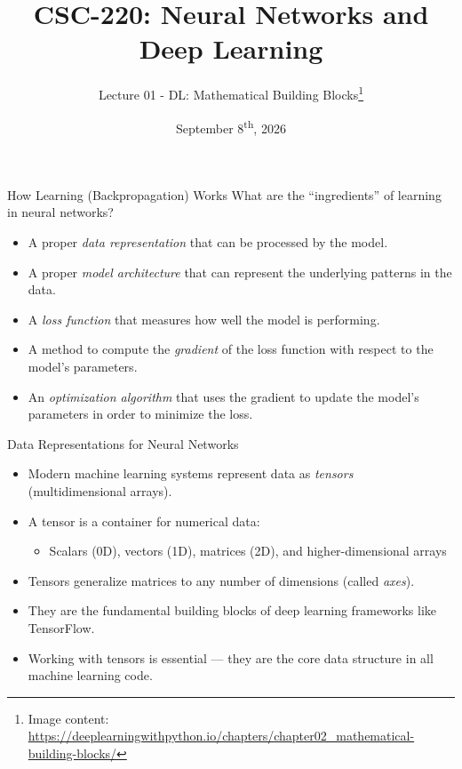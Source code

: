 \documentclass{beamer}
\title[CSC-220: Neural Networks and Deep Learning]{CSC-220: Neural Networks and Deep Learning}
\subtitle{Lecture 01 - DL: Mathematical Building Blocks\thanks{\tiny{Image content: \url{https://deeplearningwithpython.io/chapters/chapter02_mathematical-building-blocks/}}}}
\date[Sep. 8\textsuperscript{th}, 2026]{September 8\textsuperscript{th}, 2026}
\begin{document}
\thispagestyle{empty}
\frame{\titlepage}

\setcounter{framenumber}{0}



\begin{frame}{How Learning (Backpropagation) Works}
    \centering
    What are the ``ingredients'' of learning in neural networks?
    \pause
    \begin{itemize}
        \item A proper \textit{data representation} that can be processed by the model.
              \pause
        \item A proper \textit{model architecture} that can represent the underlying patterns in the data.
              \pause
        \item A \textit{loss function} that measures how well the model is performing.
              \pause
        \item A method to compute the \textit{gradient} of the loss function with respect to the model's parameters.
              \pause
        \item An \textit{optimization algorithm} that uses the gradient to update the model's parameters in order to minimize the loss.
    \end{itemize}
\end{frame}

\begin{frame}{Data Representations for Neural Networks}
    \begin{itemize}
        \item Modern machine learning systems represent data as \textit{tensors} (multidimensional arrays).

        \item A tensor is a container for numerical data:
              \begin{itemize}
                  \item Scalars (0D), vectors (1D), matrices (2D), and higher-dimensional arrays
              \end{itemize}

        \item Tensors generalize matrices to any number of dimensions (called \textit{axes}).

        \item They are the fundamental building blocks of deep learning frameworks like TensorFlow.

        \item Working with tensors is essential — they are the core data structure in all machine learning code.
    \end{itemize}
\end{frame}
\end{document}
